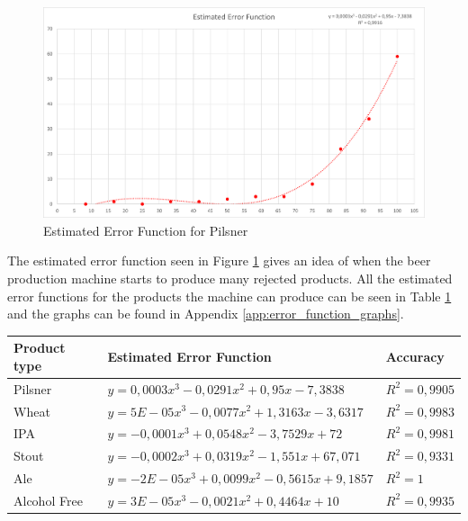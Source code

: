 \begin{figure}[ht]
	\centering
	\includegraphics[width=1\linewidth]{images/errorfunction/pilsner.png}
	\caption{Estimated Error Function for Pilsner}
	\label{figure:ef_pilsner}
\end{figure}

The estimated error function seen in Figure \ref{figure:ef_pilsner} gives an
idea of when the beer production machine starts to produce many rejected
products. All the estimated error functions for the products the machine can
produce can be seen in Table \ref{table:eef} and the graphs can be found in
Appendix \ref{app:error_function_graphs}.

\begin{table}[ht]
     \begin{tabularx}{\textwidth}{|>{\RaggedRight}p{3cm}|>{\RaggedRight}X|>{\RaggedRight}p{3cm}|}
     \hline
     \textbf{Product type} & \textbf{Estimated Error Function} & \textbf{Accuracy} \\
     \hline
     Pilsner & \(y = 0,0003x^3 - 0,0291x^2 + 0,95x - 7,3838\) & \(R^2 = 0,9905\) \\
     \hline
     Wheat & \(y = 5E-05x^3 - 0,0077x^2 + 1,3163x - 3,6317\) & \(R^2 = 0,9983\) \\
     \hline
     IPA & \(y = -0,0001x^3 + 0,0548x^2 - 3,7529x + 72\) & \(R^2 = 0,9981\) \\
     \hline
     Stout & \(y = -0,0002x^3 + 0,0319x^2 - 1,551x + 67,071\) & \(R^2 = 0,9331\) \\
     \hline
     Ale & \(y = -2E-05x^3 + 0,0099x^2 - 0,5615x + 9,1857\) & \(R^2 = 1\) \\
     \hline
     Alcohol Free & \(y = 3E-05x^3 - 0,0021x^2 + 0,4464x + 10\) & \(R^2 = 0,9935\) \\
     \hline
    \end{tabularx}
    \label{table:eef}
\end{table}

